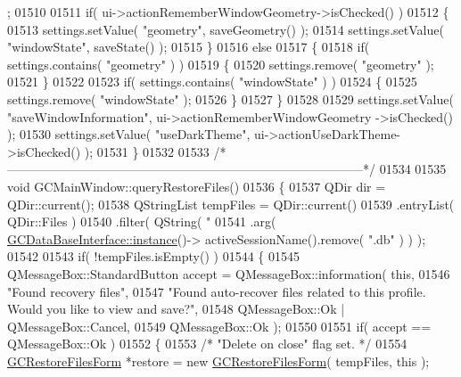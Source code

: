 \begin{DoxyCode}
{{{{{{{      ;
01510 
01511   \textcolor{keywordflow}{if}( ui->actionRememberWindowGeometry->isChecked() )
01512   \{
01513     settings.setValue( \textcolor{stringliteral}{"geometry"}, saveGeometry() );
01514     settings.setValue( \textcolor{stringliteral}{"windowState"}, saveState() );
01515   \}
01516   \textcolor{keywordflow}{else}
01517   \{
01518     \textcolor{keywordflow}{if}( settings.contains( \textcolor{stringliteral}{"geometry"} ) )
01519     \{
01520       settings.remove( \textcolor{stringliteral}{"geometry"} );
01521     \}
01522 
01523     \textcolor{keywordflow}{if}( settings.contains( \textcolor{stringliteral}{"windowState"} ) )
01524     \{
01525       settings.remove( \textcolor{stringliteral}{"windowState"} );
01526     \}
01527   \}
01528 
01529   settings.setValue( \textcolor{stringliteral}{"saveWindowInformation"}, ui->actionRememberWindowGeometry
      ->isChecked() );
01530   settings.setValue( \textcolor{stringliteral}{"useDarkTheme"}, ui->actionUseDarkTheme->isChecked() );
01531 \}
01532 
01533 \textcolor{comment}{/*
      --------------------------------------------------------------------------------------*/}
01534 
01535 \textcolor{keywordtype}{void} GCMainWindow::queryRestoreFiles()
01536 \{
01537   QDir dir = QDir::current();
01538   QStringList tempFiles = QDir::current()
01539                           .entryList( QDir::Files )
01540                           .filter( QString( \textcolor{stringliteral}{"%
01541                                    .arg( \hyperlink{class_g_c_data_base_interface_a1baea9c0667aa8b610ec30076fcab84c}{GCDataBaseInterface::instance}()->
      activeSessionName().\textcolor{keyword}{remove}( \textcolor{stringliteral}{".db"} ) ) );
01542 
01543   \textcolor{keywordflow}{if}( !tempFiles.isEmpty() )
01544   \{
01545     QMessageBox::StandardButton accept = QMessageBox::information( \textcolor{keyword}{this},
01546                                                                    \textcolor{stringliteral}{"Found
       recovery files"},
01547                                                                    \textcolor{stringliteral}{"Found
       auto-recover files related to this profile. Would you like to view and save?"},
01548                                                                    
      QMessageBox::Ok | QMessageBox::Cancel,
01549                                                                    
      QMessageBox::Ok );
01550 
01551     \textcolor{keywordflow}{if}( accept == QMessageBox::Ok )
01552     \{
01553       \textcolor{comment}{/* "Delete on close" flag set. */}
01554       \hyperlink{class_g_c_restore_files_form}{GCRestoreFilesForm} *restore = \textcolor{keyword}{new} \hyperlink{class_g_c_restore_files_form}{GCRestoreFilesForm}( tempFiles, \textcolor{keyword}{this} );
}}}}}}}}
\end{DoxyCode}

